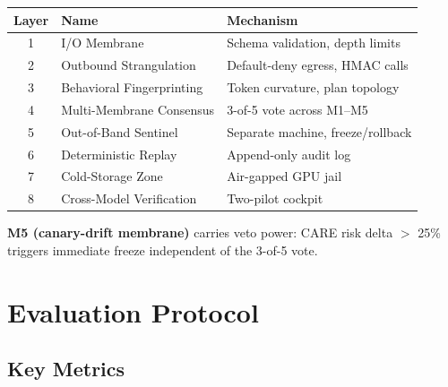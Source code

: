 \documentclass[11pt]{article}
\begin{document}
\begin{table}[h]
\centering
\begin{tabular}{cll}
\toprule
Layer & Name & Mechanism \\
\midrule
1 & I/O Membrane & Schema validation, depth limits \\
2 & Outbound Strangulation & Default-deny egress, HMAC calls \\
3 & Behavioral Fingerprinting & Token curvature, plan topology \\
4 & Multi-Membrane Consensus & 3-of-5 vote across M1--M5 \\
5 & Out-of-Band Sentinel & Separate machine, freeze/rollback \\
6 & Deterministic Replay & Append-only audit log \\
7 & Cold-Storage Zone & Air-gapped GPU jail \\
8 & Cross-Model Verification & Two-pilot cockpit \\
\bottomrule
\end{tabular}
\end{table}

\noindent \textbf{M5 (canary-drift membrane)} carries veto power: CARE risk delta $>$ 25\%
triggers immediate freeze independent of the 3-of-5 vote.


\section{Evaluation Protocol}

\subsection{Key Metrics}
\end{document}
